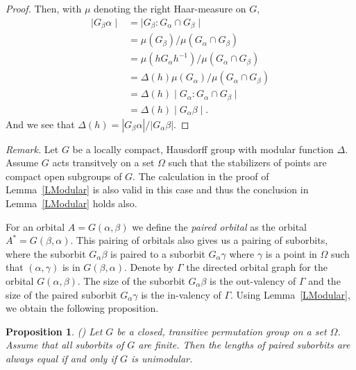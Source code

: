 \documentclass{emsprocart}
\newtheorem{proposition}[theorem]{Proposition}
\theoremstyle{definition}
\begin{document}
\noindent
\begin{proof}
  Then, with $\mu$ denoting the right
Haar-measure on $G$,
\begin{align*}
    \mid G_\beta\alpha\mid & =  \mid G_\beta:G_\alpha\cap G_\beta\mid \\
                           & =  \mu(G_\beta)/\mu(G_\alpha\cap G_\beta) \\
                           & =  \mu(hG_\alpha h^{-1})/
                                              \mu(G_\alpha\cap G_\beta) \\
                           & =  \Delta(h)\mu(G_\alpha )/
                                              \mu(G_\alpha\cap G_\beta) \\
                           & =  \Delta(h)
                              \mid G_\alpha:G_\alpha\cap G_\beta\mid \\
                           & =  \Delta(h)\mid  G_\alpha \beta\mid.
\end{align*}
And we see that $\Delta(h)={|G_\beta \alpha|}/{|G_\alpha\beta|}$.
\end{proof}

\bigskip

{\em Remark.}  Let $G$ be a locally compact, Hausdorff group with
modular function $\Delta$.  Assume $G$ acts transitvely on a set $\Omega$
such that the stabilizers of points are compact open subgroups of $G$.
The calculation in the proof of Lemma~\ref{LModular} is also valid in
this case and thus the conclusion in  Lemma~\ref{LModular} holds also.

\smallskip

For an orbital $A=G(\alpha, \beta)$ we define the {\em paired orbital}
as the orbital $A^*=G(\beta, \alpha)$.  This pairing of orbitals also
gives us a pairing of suborbits, where the
suborbit $G_\alpha\beta$ is paired to a suborbit $G_\alpha\gamma$
where $\gamma$ is a point in $\Omega$ such that $(\alpha,\gamma)$ is
in $G(\beta, \alpha)$.  Denote by $\Gamma$ the directed orbital graph for the
orbital $G(\alpha, \beta)$.  The size of the suborbit $G_\alpha\beta$
is the out-valency of $\Gamma$ and the size of the paired suborbit
$G_\alpha\gamma$ is the in-valency of $\Gamma$.
Using Lemma~\ref{LModular}, we obtain the following proposition.

\begin{proposition}{\rm (\cite[Theorem 1]{Trofimov1985a})}
Let $G$ be a closed, transitive permutation
group on a set $\Omega$.  Assume that
all suborbits of $G$ are finite.  Then the lengths of paired suborbits
are always equal if and only if ${G}$ is unimodular.
\end{proposition}
\end{document}
